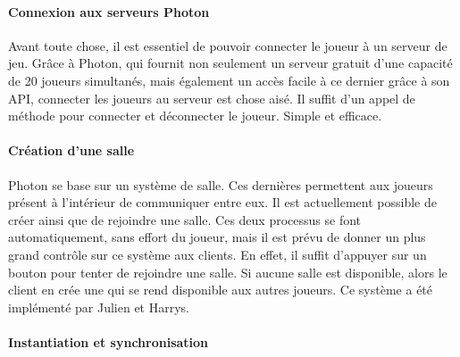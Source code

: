         \paragraph{Connexion aux serveurs Photon}

            Avant toute chose, il est essentiel de pouvoir connecter le joueur à un serveur de jeu.
            Grâce à Photon, qui fournit non seulement un serveur gratuit d'une capacité de 20 joueurs simultanés,
            mais également un accès facile à ce dernier grâce à son API, connecter les joueurs au serveur est chose
            aisé. Il suffit d'un appel de méthode pour connecter et déconnecter le joueur. Simple et efficace.


        \paragraph{Création d'une salle}

            Photon se base sur un système de salle. Ces dernières permettent aux joueurs présent à l'intérieur de communiquer entre eux.
            Il est actuellement possible de créer ainsi que de rejoindre une salle. Ces deux processus se font automatiquement, sans effort du joueur,
            mais il est prévu de donner un plus grand contrôle sur ce système aux clients.
            En effet, il suffit d'appuyer sur un bouton pour tenter de rejoindre une salle.
            Si aucune salle est disponible, alors le client en crée une qui se rend disponible aux autres joueurs.
            Ce système a été implémenté par Julien et Harrys.


        \paragraph{Instantiation et synchronisation}

